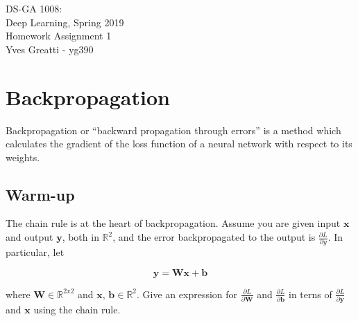 \documentclass[11pt]{article}
\def\Rset{\mathbb{R}}
\newcommand{\0}{\mat{0}}
\newcommand{\matr}[1]{\bm{#1}}     %
\newcommand{\vect}[1]{\bm{#1}}     %
\begin{document}
\noindent DS-GA 1008:\\
Deep Learning, Spring 2019\\
Homework Assignment 1 \\
Yves Greatti - yg390\\

\section{Backpropagation}

Backpropagation or “backward propagation through errors” is a method which calculates the gradient of the loss function of a neural network with respect to its weights.

\subsection{Warm-up}
The chain rule is at the heart of backpropagation. Assume you are given input  $\vect{x}$ and output $\vect{y}$, both in $\Rset^2$, and the error backpropagated to the output is $\frac{ \partial L}{\partial y}$. In particular, let

\begin{equation*}
\vect{y} = \matr{W} \vect{x} + \vect{b}
\end{equation*}

where $\matr{W} \in \Rset^{2x2}$ and $\vect{x}$, $\vect{b} \in \Rset^2$. Give an expression for   $\frac{ \partial L}{\partial \matr{W}}$ and  $\frac{ \partial L}{\partial \vect{b}}$ in terns of $\frac{ \partial L}{\partial \vect{y}}$ and $\vect{x}$ using the chain rule.
\end{document}
